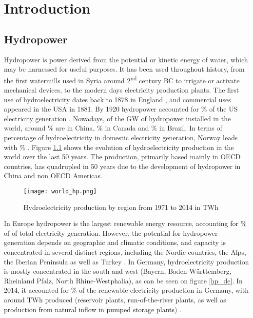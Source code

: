 \chapter{Introduction}
\label{chap:introduction}


\section{Hydropower}

Hydropower is power derived from the potential or kinetic energy of water, which may be harnessed for useful purposes. It has been used throughout history, from the first watermills used in Syria around 2\textsuperscript{nd} century BC \cite{reynolds} to irrigate or activate mechanical devices, to the modern days electricity production plants. The first use of hydroelectricity dates back to 1878 in England \cite{indus_arch}, and commercial uses appeared in the USA in 1881. By 1920 hydropower accounted for \unit[25]{\%} of the US electricity generation \cite{hist_hyd}. \newline
Nowadays, of the \unit[1171]{GW} of hydropower installed in the world, around \unit[27]{\%} are in China, \unit[10]{\%} in Canada and \unit[9]{\%} in Brazil. In terms of percentage of hydroelectricity in domestic electricity generation, Norway leads with \unit[96]{\%} \cite{iea_stat}. Figure \ref{world_hp} shows the evolution of hydroelectricity production in the world over the last 50 years. The production, primarily based mainly in OECD countries, has quadrupled in 50 years due to the development of hydropower in China and non OECD Americas.

\begin{figure}[H]
\centering
\texttt{[image: world\_hp.png]}
\caption[Hydroelectricity production by region from 1971 to 2014 in TWh]{Hydroelectricity production by region from 1971 to 2014 in TWh \cite{iea_stat}}
\label{world_hp}
\end{figure}

In Europe hydropower is the largest renewable energy resource, accounting for \unit[18]{\%} of of total electricity generation. However, the potential for hydropower generation depends on geographic and climatic conditions, and capacity is concentrated in several distinct regions, including the Nordic countries, the Alps, the Iberian Peninsula as well as Turkey \cite{hp_europe}. \newline
In Germany, hydroelectricity production is mostly concentrated in the south and west (Bayern, Baden-Württemberg, Rheinland Pfalz, North Rhine-Westphalia), as can be seen on figure \ref{hp_de}. In 2014, it accounted for \unit[12]{\%} of the renewable electricity production in Germany, with around \unit[20]{TWh} produced (reservoir plants, run-of-the-river plants, as well as production from natural inflow in pumped storage plants) \cite{bdew}.

